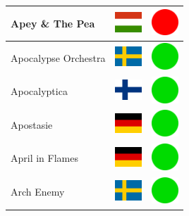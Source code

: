 \documentclass[12pt, a4paper, twoside]{report}
\begin{document}
\begin{center}
\begin{longtable}{|p{5cm}|p{2cm}|p{2cm}|}
 Apey \& The Pea                                            & \includegraphics[width=1cm]{../4x3/hu} &   \includegraphics[width=1cm]{../likes/n} \\ \hline
 Apocalypse Orchestra                                       & \includegraphics[width=1cm]{../4x3/se} &   \includegraphics[width=1cm]{../likes/y} \\ \hline
 Apocalyptica                                               & \includegraphics[width=1cm]{../4x3/fi} &   \includegraphics[width=1cm]{../likes/y} \\ \hline
 Apostasie                                                  & \includegraphics[width=1cm]{../4x3/de} &   \includegraphics[width=1cm]{../likes/y} \\ \hline
 April in Flames                                            & \includegraphics[width=1cm]{../4x3/de} &   \includegraphics[width=1cm]{../likes/y} \\ \hline
 Arch Enemy                                                 & \includegraphics[width=1cm]{../4x3/se} &   \includegraphics[width=1cm]{../likes/y} \\ \hline

\end{longtable}
\end{center}
\end{document}
